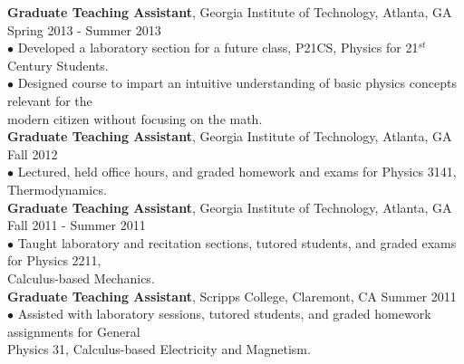 \documentclass[10pt]{article}
\begin{document}
{\bf Graduate Teaching Assistant}, Georgia Institute of Technology, Atlanta, GA \hfill Spring 2013 - Summer 2013\\
\hspace*{10pt}$\bullet$ Developed a laboratory section for a future class, P21CS, Physics for 21$^{st}$ Century Students. \\
\hspace*{10pt}$\bullet$ Designed course to impart an intuitive understanding of basic physics concepts relevant for the \\ \hspace*{15pt} modern citizen without focusing on the math. \\

{\bf Graduate Teaching Assistant}, Georgia Institute of Technology, Atlanta, GA \hfill Fall 2012 \\
\hspace*{10pt}$\bullet$ Lectured, held office hours, and graded homework and exams for Physics 3141, Thermodynamics. \\


{\bf Graduate Teaching Assistant}, Georgia Institute of Technology, Atlanta, GA \hfill Fall 2011 - Summer 2011\\
\hspace*{10pt}$\bullet$ Taught laboratory and recitation sections, tutored students, and graded exams for Physics 2211, \\ \hspace*{15pt} Calculus-based Mechanics. \\


{\bf  Graduate Teaching Assistant}, Scripps College, Claremont, CA \hfill Summer 2011\\
\hspace*{10pt}$\bullet$ Assisted with laboratory sessions, tutored students, and graded homework assignments for General\\ \hspace*{15pt} Physics 31, Calculus-based Electricity and Magnetism. \\
\end{document}

